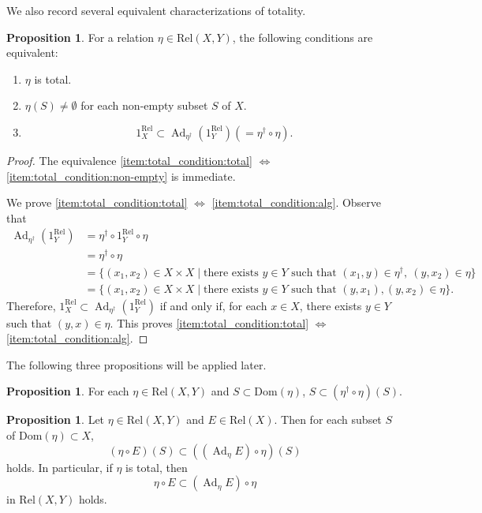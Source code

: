 \documentclass[12pt, a4paper]{amsart}
\theoremstyle{definition}
\newtheorem{proposition}[theorem]{Proposition}
\newcommand{\Ad}{\mathop{\mathrm{Ad}}\nolimits}
\newcommand{\Rel}{\mathrm{Rel}}
\newcommand{\Dom}{\mathrm{Dom}}
\begin{document}
We also record several equivalent characterizations of totality.

\begin{proposition}\label{proposition:total_condition}
For a relation $\eta\in\Rel(X,Y)$, the following conditions are equivalent:
\begin{enumerate}
\item\label{item:total_condition:total}
$\eta$ is total.

\item\label{item:total_condition:non-empty}
$\eta(S)\neq\emptyset$ for each non-empty subset $S$ of $X$.

\item\label{item:total_condition:alg}
\[
1_X^{\Rel}
\subset
\Ad_{\eta^\dagger}(1_Y^{\Rel})
(=\eta^\dagger\circ\eta).
\]
\end{enumerate}
\end{proposition}

\begin{proof}
The equivalence
\eqref{item:total_condition:total}
$\Leftrightarrow$
\eqref{item:total_condition:non-empty}
is immediate.

We prove
\eqref{item:total_condition:total}
$\Leftrightarrow$
\eqref{item:total_condition:alg}.
Observe that
\begin{align*}
\Ad_{\eta^\dagger}(1_Y^\Rel)
&=
\eta^\dagger\circ1_Y^\Rel\circ\eta
\\
&=
\eta^\dagger\circ\eta
\\
&=
\{
(x_1,x_2)\in X\times X
\mid
\text{there exists }y\in Y
\text{ such that }
(x_1,y)\in\eta^\dagger,
\ (y,x_2)\in\eta
\}
\\
&=
\{
(x_1,x_2)\in X\times X
\mid
\text{there exists }y\in Y
\text{ such that }
(y,x_1),(y,x_2)\in\eta
\}.
\end{align*}
Therefore,
$1_X^\Rel\subset\Ad_{\eta^\dagger}(1_Y^\Rel)$
if and only if, for each $x\in X$, there exists $y\in Y$ such that
$(y,x)\in\eta$.
This proves
\eqref{item:total_condition:total}
$\Leftrightarrow$
\eqref{item:total_condition:alg}.
\end{proof}

The following three propositions will be applied later.

\begin{proposition}\label{proposition:SDometatotal}
For each $\eta \in \Rel(X,Y)$ and $S \subset \Dom(\eta)$, 
$S \subset (\eta^\dagger \circ \eta)(S)$.    
\end{proposition}

\begin{proposition}\label{proposition:total_adjoint}
Let $\eta\in\Rel(X,Y)$ and $E \in \Rel(X)$.
Then for each subset $S$ of $\Dom(\eta) \subset X$, 
\[
(\eta \circ E)(S) \subset ((\Ad_\eta E)\circ \eta)(S)
\]
holds.
In particular, if $\eta$ is total, then 
\[
\eta\circ E \subset (\Ad_\eta E)\circ \eta
\]
in $\Rel(X,Y)$ holds.
\end{proposition}
\end{document}

